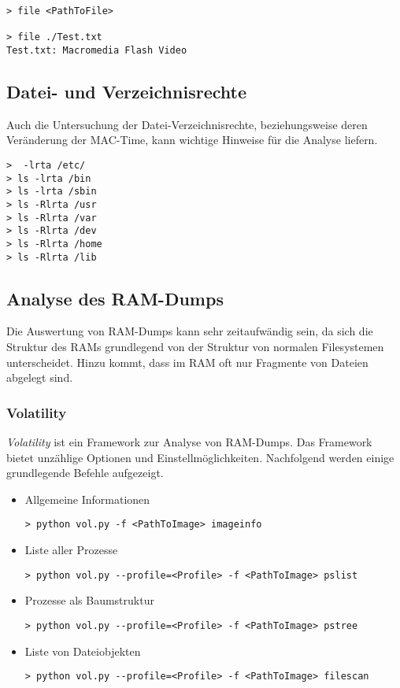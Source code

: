 \begin{lstlisting}
> file <PathToFile>

> file ./Test.txt
Test.txt: Macromedia Flash Video
\end{lstlisting}

\subsection{Datei- und Verzeichnisrechte}
Auch die Untersuchung der Datei-Verzeichnisrechte, beziehungsweise deren Veränderung der MAC-Time, kann wichtige Hinweise für die Analyse liefern.

\begin{lstlisting}
>  -lrta /etc/
> ls -lrta /bin
> ls -lrta /sbin
> ls -Rlrta /usr
> ls -Rlrta /var
> ls -Rlrta /dev
> ls -Rlrta /home
> ls -Rlrta /lib
\end{lstlisting}

\subsection{Analyse des RAM-Dumps}
Die Auswertung von RAM-Dumps kann sehr zeitaufwändig sein, da sich die Struktur des RAMs grundlegend von der Struktur von normalen Filesystemen unterscheidet. Hinzu kommt, dass im RAM oft nur Fragmente von Dateien abgelegt sind.

\subsubsection{Volatility}
\textit{Volatility} ist ein Framework zur Analyse von RAM-Dumps. Das Framework bietet unzählige Optionen und Einstellmöglichkeiten. Nachfolgend werden einige grundlegende Befehle aufgezeigt.

\begin{itemize}
\item Allgemeine Informationen
\begin{lstlisting}
> python vol.py -f <PathToImage> imageinfo
\end{lstlisting}

\item Liste aller Prozesse
\begin{lstlisting}
> python vol.py --profile=<Profile> -f <PathToImage> pslist
\end{lstlisting}

\item Prozesse als Baumstruktur
\begin{lstlisting}
> python vol.py --profile=<Profile> -f <PathToImage> pstree
\end{lstlisting}

\item Liste von Dateiobjekten
\begin{lstlisting}
> python vol.py --profile=<Profile> -f <PathToImage> filescan
\end{lstlisting}

\end{itemize}

